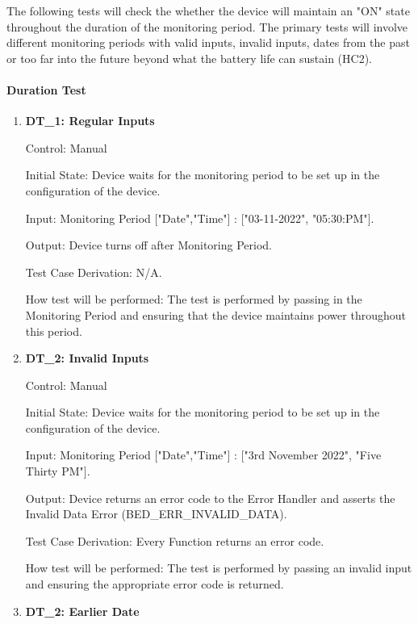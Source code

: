 \documentclass[12pt, titlepage]{article}
\begin{document}
The following tests will check the whether the device will maintain an "ON" state throughout the duration of the monitoring period. The primary tests will involve different monitoring periods with valid inputs, invalid inputs, dates from the past or too far into the future beyond what the battery life can sustain (HC2).
		
\paragraph{Duration Test}

\begin{enumerate}

	\item{\textbf{DT\_1: Regular Inputs}\\}
	
		Control: Manual 
							
		Initial State: Device waits for the monitoring period to be set up in the configuration of the device.
							
		Input: Monitoring Period ["Date","Time"]  : ["03-11-2022", "05:30:PM"].
		
		Output: Device turns off after Monitoring Period.
		
		Test Case Derivation: N/A.
							
		How test will be performed: The test is performed by passing in the Monitoring Period and ensuring that the device maintains power throughout this period.
					
	\item{\textbf{DT\_2: Invalid Inputs}\\}
	
		Control: Manual 
							
		Initial State: Device waits for the monitoring period to be set up in the configuration of the device.
							
		Input: Monitoring Period ["Date","Time"] : ["3rd November 2022", "Five Thirty PM"].
							
		Output: Device returns an error code to the Error Handler and asserts the Invalid Data Error (BED\_ERR\_INVALID\_DATA).
		
		Test Case Derivation: Every Function returns an error code.
		
		How test will be performed: The test is performed by passing an invalid input and ensuring the appropriate error code is returned.

	\item{\textbf{DT\_2: Earlier Date}\\}
		

\end{enumerate}
\end{document}
